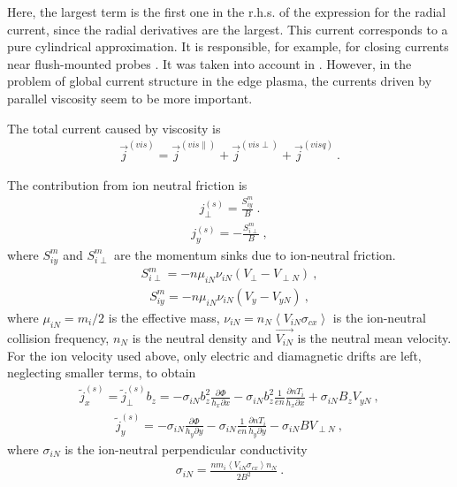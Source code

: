 \documentclass[a4paper,10pt]{report}
\begin{document}
Here, the largest term is the first one in the r.h.s. of the expression
for the radial current, since the radial derivatives are the largest.
This current corresponds to a pure cylindrical approximation. It is
responsible, for example, for closing currents near flush-mounted probes
\cite{ROZ99A}.
It was taken into account in
\cite{ROGNLIEN99A, RADFORD96A}. However, in the problem of global current
structure in the edge plasma, the currents driven by parallel viscosity seem
to be more important.

The total current caused by viscosity is
\begin{gather}
\vec{j}^{\left(vis\right)} = \vec{j}^{\left(vis \parallel\right)} +
\vec{j}^{\left(vis \perp\right)} +
\vec{j}^{\left(vis q\right)}
~.
\end{gather}

The contribution from ion neutral friction is
\begin{gather}
j_{\perp}^{\left(s\right)} = \frac{S_{iy}^m}{B}
~.
\end{gather}
\begin{gather}
j_{y}^{\left(s\right)} = -\frac{S_{i \perp}^m}{B}
~,
\end{gather}
where $S_{iy}^m$ and $S_{i \perp}^m$ are the momentum sinks due to
ion-neutral friction.
\begin{gather}
S_{i \perp}^m = - n \mu_{iN} \nu_{iN} \left( V_{\perp} - V_{\perp N}\right)
~,
\end{gather}
\begin{gather}
S_{i y}^m = - n \mu_{iN} \nu_{iN} \left( V_{y} - V_{y N}\right)
~,
\end{gather}
where $\mu_{iN}=m_i/2$ is the effective mass,
$\nu_{iN}= n_N \left\langle V_{iN} \sigma_{cx} \right\rangle$
is the ion-neutral collision frequency,
$n_N$ is the neutral density and $\vec{V_{iN}}$ is the neutral mean
velocity. For the ion velocity used above,
only electric and diamagnetic drifts are left, neglecting smaller terms,
to obtain
\begin{gather}
\tilde j_{x}^{\left(s\right)} = \tilde j_{\perp}^ {\left(s\right)} b_z =
- \sigma _{iN} b_z^2 \frac{\partial \Phi}{h_x \partial x}-
\sigma _{iN} b_z^2 \frac{1}{e n}\frac{\partial n T_i}{h_x \partial x}+
\sigma _{iN} B_z V_{yN}
~,
\end{gather}
\begin{gather}
\tilde j_{y}^{\left(s\right)} =
- \sigma _{iN} \frac{\partial \Phi}{h_y \partial y}-
\sigma _{iN} \frac{1}{e n}\frac{\partial n T_i}{h_y \partial y}-
\sigma _{iN} B V_{\perp N}
~,
\end{gather}
where $\sigma _{iN}$ is the ion-neutral perpendicular conductivity
\begin{gather}
\sigma _{iN} =
\frac{n m_i \left\langle V_{iN} \sigma_{cx} \right\rangle n_N}{2 B^2}
~.
\end{gather}
\end{document}
